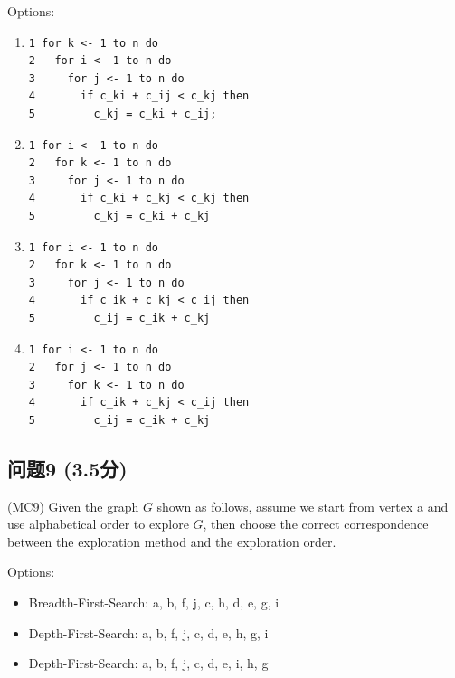 \documentclass[11pt, a4paper]{article}
\begin{document}
Options:
\begin{enumerate}[label=\arabic*., leftmargin=*]
    \item \begin{verbatim}
1 for k <- 1 to n do
2   for i <- 1 to n do
3     for j <- 1 to n do
4       if c_ki + c_ij < c_kj then
5         c_kj = c_ki + c_ij;
    \end{verbatim}
    \item \begin{verbatim}
1 for i <- 1 to n do
2   for k <- 1 to n do
3     for j <- 1 to n do
4       if c_ki + c_kj < c_kj then
5         c_kj = c_ki + c_kj
    \end{verbatim}
    \item \begin{verbatim}
1 for i <- 1 to n do
2   for k <- 1 to n do
3     for j <- 1 to n do
4       if c_ik + c_kj < c_ij then
5         c_ij = c_ik + c_kj
    \end{verbatim}
    \item \begin{verbatim}
1 for i <- 1 to n do
2   for j <- 1 to n do
3     for k <- 1 to n do
4       if c_ik + c_kj < c_ij then
5         c_ij = c_ik + c_kj
    \end{verbatim}
\end{enumerate}

\subsection*{问题9 (3.5分)}
(MC9) Given the graph \(G\) shown as follows, assume we start from vertex a and use alphabetical order to explore \(G\), then choose the correct correspondence between the exploration method and the exploration order.


Options:
\begin{itemize}
    \item Breadth-First-Search: a, b, f, j, c, h, d, e, g, i
    \item Depth-First-Search: a, b, f, j, c, d, e, h, g, i
    \item Depth-First-Search: a, b, f, j, c, d, e, i, h, g
\end{itemize}
\end{document}
